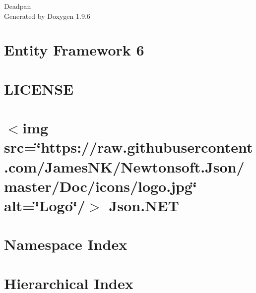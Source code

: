 \documentclass[twoside]{book}
\newcommand{\+}{\discretionary{\mbox{\scriptsize$\hookleftarrow$}}{}{}}
\newcommand{\clearemptydoublepage}{%
    \newpage{\pagestyle{empty}\cleardoublepage}%
  }
\begin{document}
  \raggedbottom
    \hypersetup{pageanchor=false,
                bookmarksnumbered=true,
                pdfencoding=unicode
               }
  \begin{titlepage}
  \vspace*{7cm}
  \begin{center}%
  {\Large Deadpan}\\
  \vspace*{1cm}
  {\large Generated by Doxygen 1.9.6}\\
  \end{center}
  \end{titlepage}
  \clearemptydoublepage
  \tableofcontents
  \clearemptydoublepage
  \hypersetup{pageanchor=true}
\chapter{Entity Framework 6}
\label{md_packages__entity_framework_6_5_1__r_e_a_d_m_e}

\chapter{LICENSE}
\label{md_packages__newtonsoft__json_13_0_3__l_i_c_e_n_s_e}

\chapter{\texorpdfstring{$<$}{<}img src=\char`\"{}https\+://raw.\+githubusercontent.\+com/\+James\+NK/\+Newtonsoft.\+Json/master/\+Doc/icons/logo.\+jpg\char`\"{} alt=\char`\"{}\+Logo\char`\"{}/\texorpdfstring{$>$}{>} Json.\+NET}
\label{md_packages__newtonsoft__json_13_0_3__r_e_a_d_m_e}

\chapter{Namespace Index}

\chapter{Hierarchical Index}

\end{document}
